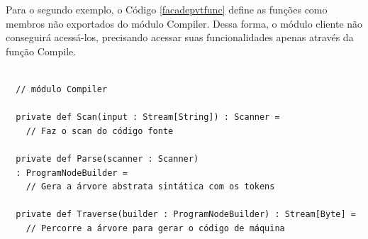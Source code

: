 Para o segundo exemplo, o Código \ref{facadepvtfunc} define 
as funções como membros não exportados do módulo Compiler. 
Dessa forma, o módulo cliente não conseguirá acessá-los, 
precisando acessar suas funcionalidades apenas através da 
função Compile.

\begin{lstlisting}[caption={Função de acesso Compile.},label=facadepvtfunc]
    
  // módulo Compiler    

  private def Scan(input : Stream[String]) : Scanner = 
    // Faz o scan do código fonte

  private def Parse(scanner : Scanner)
  : ProgramNodeBuilder = 
    // Gera a árvore abstrata sintática com os tokens

  private def Traverse(builder : ProgramNodeBuilder) : Stream[Byte] = 
    // Percorre a árvore para gerar o código de máquina
    
\end{lstlisting}

